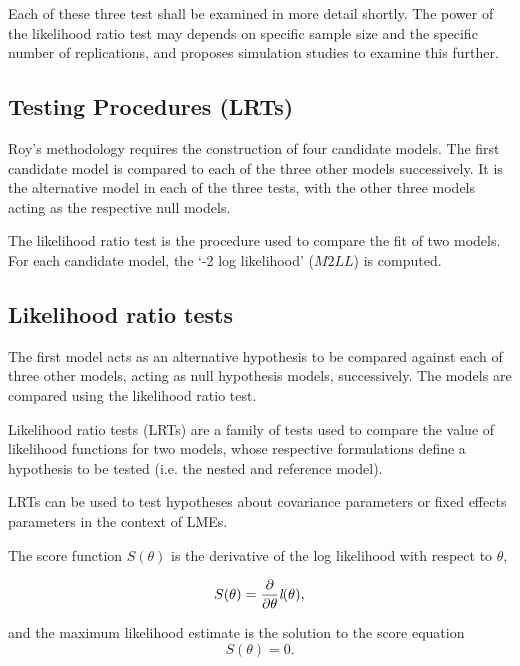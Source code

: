 \documentclass[12pt, a4paper]{report}
\theoremstyle{plain}
\theoremstyle{definition}
\theoremstyle{remark}
\begin{document}
	Each of these three test shall be examined in more detail shortly.
	The power of the likelihood ratio test may depends on specific sample size and the specific number of replications, and \citet{ARoy2009} proposes simulation studies to examine this further.
	
	
	
	
	
	\subsection{Testing Procedures (LRTs)}
	Roy's methodology requires the construction of four candidate models. The first candidate model is compared to each of the three other models successively. It is the alternative model in each of the three tests, with the other three models acting as the respective null models.
	
	
	The likelihood ratio test is the procedure used to compare the fit of two models. For each candidate model, the `-2 log likelihood' ($M2LL$) is computed. 
	
	\subsection{Likelihood ratio tests}
	
	
	
	
	The first model acts as an alternative hypothesis to be compared against each of three other models, acting as null hypothesis models, successively. The models are compared using the likelihood ratio test. 
	\bigskip
	
	Likelihood ratio tests (LRTs) are a family of tests used to compare the value of likelihood functions for two models, whose respective formulations define a hypothesis to be tested (i.e. the nested and reference model).
	
	
	LRTs can be used to test hypotheses about
	covariance parameters or fixed effects parameters in the context
	of LMEs.
	
	
	
	The score function $S(\theta)$ is the derivative of the log likelihood with respect to $\theta$,
	
	\[
	S(\theta) = \frac{\partial}{\partial \theta}\emph{l}(\theta),
	\]
	
	and the maximum likelihood estimate is the solution to the score equation
	\[
	S(\theta) = 0.
	\]
	
\end{document}
